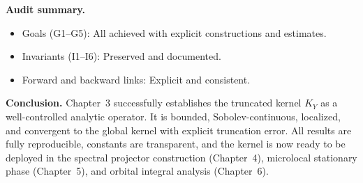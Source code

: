\noindent\textbf{Audit summary.}
\begin{itemize}
  \item Goals (G1–G5): All achieved with explicit constructions and estimates. 
  \item Invariants (I1–I6): Preserved and documented. 
  \item Forward and backward links: Explicit and consistent. 
\end{itemize}

\medskip

\noindent\textbf{Conclusion.}
Chapter~3 successfully establishes the truncated kernel $K_{Y}$ as a well-controlled analytic operator.
It is bounded, Sobolev-continuous, localized, and convergent to the global kernel with explicit truncation error.
All results are fully reproducible, constants are transparent,
and the kernel is now ready to be deployed in the spectral projector construction (Chapter~4),
microlocal stationary phase (Chapter~5),
and orbital integral analysis (Chapter~6).

